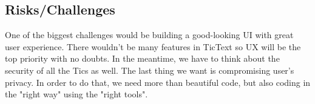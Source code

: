 \subsection{Risks/Challenges}
One of the biggest challenges would be building a good-looking UI with great user experience. There wouldn't be many features in TicText so UX will be the top priority with no doubts. In the meantime, we have to think about the security of all the Tics as well. The last thing we want is compromising user's privacy. In order to do that, we need more than beautiful code, but also coding in the "right way" using the "right tools".
